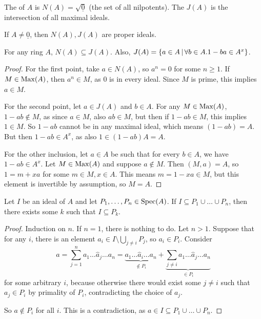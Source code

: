 \begin{definition}
  The  of $A$ is $N(A) = \sqrt{\underline{0}}$ (the set of all
  nilpotents).
  The  $J(A)$ is the intersection of all maximal ideals.
\end{definition}

\begin{remark}
  If $A \ne \underline{0}$, then $N(A), J(A)$ are proper ideals.
\end{remark}

\begin{lemma}
  For any ring $A$, $N(A) \subseteq J(A)$.
  Also, $J(A) = \{ a \in A \,|\, \forall b \in A . 1 - ba \in A^x \}$.
\end{lemma}

\begin{proof}
  For the first point, take $a \in N(A)$, so $a^n = 0$ for some $n \ge 1$.
  If $M \in \operatorname{Max}(A)$, then $a^n \in M$, as $0$ is in every ideal.
  Since $M$ is prime, this implies $a \in M$.

  For the second point, let $a \in J(A)$ and $b \in A$.
  For any $M \in \operatorname{Max}(A)$, $1 - ab \notin M$, as since $a \in M$, also $ab \in
  M$, but then if $1 - ab \in M$, this implies $1 \in M$.
  So $1 - ab$ cannot be in any maximal ideal, which means $(1-ab) = A$.
  But then $1 - ab \in A^x$, as also $1 \in (1-ab) A = A$.

  For the other inclusion, let $a \in A$ be such that for every $b \in A$, we
  have $1 - ab \in A^x$.
  Let $M \in \operatorname{Max}(A)$ and suppose $a \notin M$.
  Then $(M, a) = A$, so $1 = m + xa$ for some $m \in M, x \in A$.
  This means $m = 1 - xa \in M$, but this element is invertible by assumption,
  so $M = A$.
  \protislovje{}
\end{proof}

\begin{lemma}
  Let $I$ be an ideal of $A$ and let $P_1, \ldots, P_n \in \operatorname{Spec}(A)$.
  If $I \subseteq P_1 \cup \ldots \cup P_n$, then there exists some $k$ such
  that $I \subseteq P_k$.
\end{lemma}

\begin{proof}
  Induction on $n$.
  If $n = 1$, there is nothing to do.
  Let $n > 1$.
  Suppose that for any $i$, there is an element $a_i \in I \setminus \bigcup_{j
	\ne i} P_j$, so $a_i \in P_i$.
  Consider
  \[
	a = \sum_{j=1}^n a_1 \ldots \hat{a}_j \ldots a_n
	= \underbrace{a_1 \ldots \hat{a}_i \ldots a_n}_{\notin P_i} +
	\underbrace{\sum_{j \ne i} a_1 \ldots \hat{a}_j \ldots a_n}_{\in P_i}
  \]
  for some arbitrary $i$, because otherwise there would exist some $j \ne i$
  such that $a_j \in P_i$ by primality of $P_i$, contradicting the choice of
  $a_j$.

  So $a \notin P_i$ for all $i$.
  This is a contradiction, as $a \in I \subseteq P_1 \cup \ldots \cup P_n$.
\end{proof}

